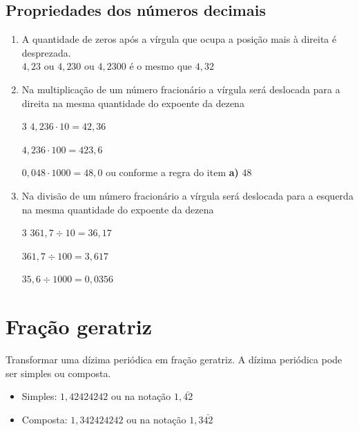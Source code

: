 \subsection{Propriedades dos números decimais}
	\begin{enumerate}[label=\alph*)]
		\item A quantidade de zeros após a vírgula que ocupa a posição mais à direita é desprezada.\\
		$ 4,23 $ ou $ 4,230 $ ou $ 4,2300 $ é o mesmo que $ 4,32 $
		
		\item Na multiplicação de um número fracionário a vírgula será deslocada para a direita na mesma quantidade do expoente da dezena
		\begin{multicols}{3}
			$ 4,236 \cdot 10 = 42,36 $
			
			\columnbreak
			$ 4,236 \cdot 100 = 423,6 $
			
			\columnbreak
			$ 0,048 \cdot 1000 = 48,0 $ ou conforme a regra do item \textbf{a)} $ 48 $
			
		\end{multicols}
		
		\item Na divisão de um número fracionário a vírgula será deslocada para a esquerda na mesma quantidade do expoente da dezena
		\begin{multicols}{3}
			$ 361,7 \div 10 = 36,17 $
			
			\columnbreak
			$ 361,7 \div 100 = 3,617 $
			
			\columnbreak
			$ 35,6 \div 1000 = 0,0356 $
			
		\end{multicols}
	\end{enumerate}

\section{Fração geratriz}
Transformar uma dízima periódica em fração geratriz. A dízima periódica pode ser simples ou composta.
\begin{itemize}
	\item Simples: $ 1,42424242 $ ou na notação $ 1,\bar{42} $
	\item Composta: $ 1,342424242 $ ou na notação $ 1,3\bar{42} $
\end{itemize}


